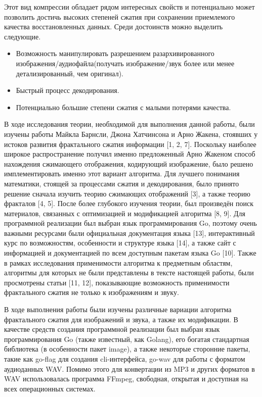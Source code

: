 \documentclass[bachelor,paper]{pmk-graduate}
\theoremstyle{definition}
\begin{document}
Этот вид компрессии обладает рядом интересных свойств и потенциально может позволить достичь высоких степеней сжатия при сохранении приемлемого качества восстановленных данных. Среди достоинств можно выделить следующие.
\begin{itemize}
  \item Возможность манипулировать разрешением разархивированного изображения/аудиофайла(получать изображение/звук более или менее детализированный, чем оригинал).
  \item Быстрый процесс декодирования.
  \item Потенциально большие степени сжатия с малыми потерями качества.
\end{itemize}


\review
В ходе исследования теории, необходимой для выполнения данной работы, были изучены работы Майкла Барнсли, Джона Хатчинсона и Арно Жакена, стоявших у истоков развития фрактального сжатия информации [1, 2, 7]. Поскольку наиболее широкое распространение получил именно предложенный Арно Жакеном способ нахождения сжимающего отображения, кодирующий изображение, было решено имплементировать именно этот вариант алгоритма. Для лучшего понимания математики, стоящей за процессами сжатия и декодирования, было принято решение сначала изучить теорию сжимающих отображений [3], а также теорию фракталов [4, 5]. После более глубокого изучения теории, был произведён поиск материалов, связанных с оптимизацией и модификацией алгоритма [8, 9]. Для программной реализации был выбран язык программирования Go, поэтому очень важными ресурсами были официальная документация языка [13], интерактивный курс по возможностям, особенности и структуре языка [14], а также сайт с информацией и документацией по всем доступным пакетам языка Go [10]. Также в рамках исследования применимости алгоритма к предметным областям, алгоритмы для которых не были представлены в тексте настоящей работы, были просмотрены статьи [11, 12], показывающие возможность применимости фрактального сжатия не только к изображениям и звуку.

\goalandtasks

\tools
В ходе выполнения работы были изучены различные вариации алгоритма фрактального сжатия для изображений и звука, а также их модификации. В качестве средств создания программной реализации был выбран язык программирования Go (также известный, как Golang), его богатая стандартная библиотека (в особенности пакет image), а также некоторые сторонние пакеты, такие как go-flag для создания cli-интерфейса, go-wav для работы с форматом аудиоданных WAV. Помимо этого для конвертации из MP3 и других форматов в WAV использовалась программа FFmpeg, свободная, открытая и доступная на всех операционных системах.
\end{document}
